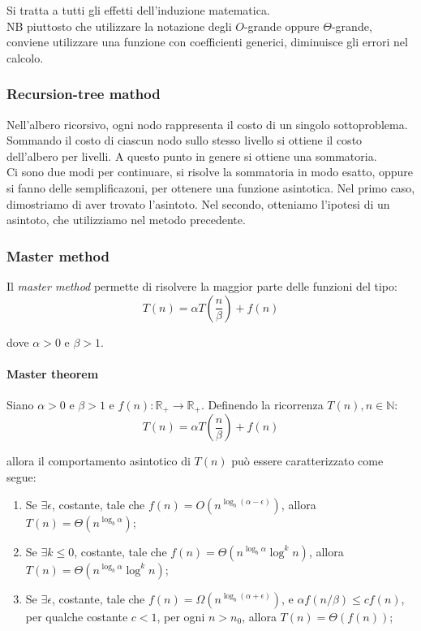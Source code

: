 \documentclass{article}
\begin{document}
Si tratta a tutti gli effetti dell'induzione matematica.\\
NB piuttosto che utilizzare la notazione degli $O$-grande oppure
$\Theta$-grande, conviene utilizzare una funzione con coefficienti generici,
diminuisce gli errori nel calcolo.

\subsubsection{Recursion-tree mathod}
Nell'albero ricorsivo, ogni nodo rappresenta il costo di un singolo
sottoproblema. Sommando il costo di ciascun nodo sullo stesso livello si ottiene
il costo dell'albero per livelli. A questo punto in genere si ottiene una
sommatoria.\\
Ci sono due modi per continuare, si risolve la sommatoria in modo esatto, oppure
si fanno delle semplificazoni, per ottenere una funzione asintotica. Nel primo
caso, dimostriamo di aver trovato l'asintoto. Nel secondo, otteniamo l'ipotesi
di un asintoto, che utilizziamo nel metodo precedente.

\subsubsection{Master method}
Il \textit{master method} permette di risolvere la maggior parte delle funzioni
del tipo:
\begin{equation}
	T(n) = \alpha T(\frac{n}{\beta}) + f(n)
\end{equation}

dove $\alpha > 0 $ e $\beta > 1 $.

\paragraph{Master theorem} Siano $ \alpha > 0 $ e $ \beta > 1 $ e $f(n):
	\mathbb{R}_+ \rightarrow \mathbb{R}_+$. Definendo la ricorrenza $T(n), n \in
	\mathbb{N}$:
\begin{equation*}
	T(n) = \alpha T(\frac{n}{\beta}) + f(n)
\end{equation*}

allora il comportamento asintotico di $T(n)$ può essere caratterizzato come
segue:
\begin{enumerate}
	\item Se $\exists \epsilon $, costante, tale che $f(n) = O(n^{\log_b(\alpha -
				      \epsilon)})$, allora $T(n) = \Theta(n^{\log_b \alpha})$;

	\item Se $\exists k \leq 0 $, costante, tale che $f(n) = \Theta(n^{\log_b \alpha}
		      \log^kn)$, allora $T(n) = \Theta(n^{\log_b \alpha} \log^kn)$;

	\item Se $\exists \epsilon $, costante, tale che $f(n) = \Omega(n^{\log_b(\alpha +
			      \epsilon)})$, e $\alpha f(n/ \beta) \leq cf(n) $, per qualche costante
	      $c< 1$, per ogni $n>n_0$, allora $T(n) = \Theta(f(n))$;

\end{enumerate}
\end{document}
